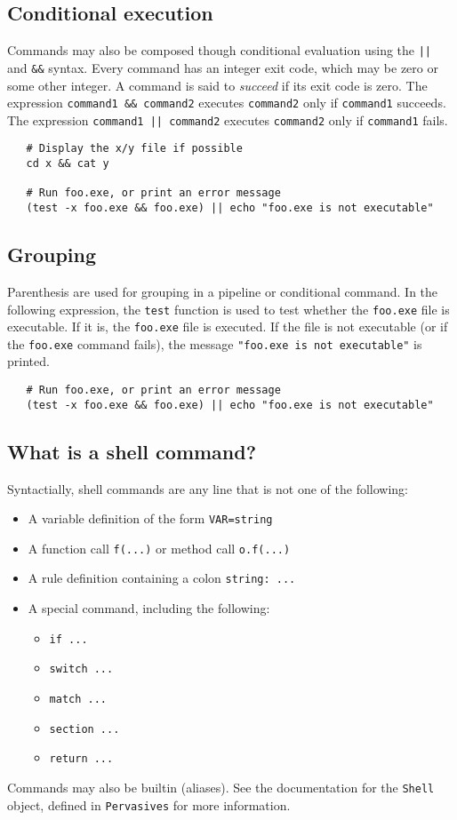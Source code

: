 \subsection{Conditional execution}

Commands may also be composed though conditional evaluation using the \verb+||+ and \verb+&&+
syntax.  Every command has an integer exit code, which may be zero or some other integer.  A command
is said to \emph{succeed} if its exit code is zero.  The expression \verb+command1 && command2+
executes \verb+command2+ only if \verb+command1+ succeeds.  The expression
\verb+command1 || command2+ executes \verb+command2+ only if \verb+command1+ fails.

\begin{verbatim}
   # Display the x/y file if possible
   cd x && cat y

   # Run foo.exe, or print an error message
   (test -x foo.exe && foo.exe) || echo "foo.exe is not executable"
\end{verbatim}

\subsection{Grouping}

Parenthesis are used for grouping in a pipeline or conditional command.  In the following
expression, the \verb+test+ function is used to test whether the \verb+foo.exe+ file is executable.
If it is, the \verb+foo.exe+ file is executed.  If the file is not executable (or if the
\verb+foo.exe+ command fails), the message \verb+"foo.exe is not executable"+ is printed.

\begin{verbatim}
   # Run foo.exe, or print an error message
   (test -x foo.exe && foo.exe) || echo "foo.exe is not executable"
\end{verbatim}

\subsection{What is a shell command?}

Syntactially, shell commands are any line that is not one of the following:

\begin{itemize}
\item A variable definition of the form \verb+VAR=string+
\item A function call \verb+f(...)+ or method call \verb+o.f(...)+
\item A rule definition containing a colon \verb+string: ...+
\item A special command, including the following:
\begin{itemize}
\item \verb+if ...+
\item \verb+switch ...+
\item \verb+match ...+
\item \verb+section ...+
\item \verb+return ...+
\end{itemize}
\end{itemize}

Commands may also be builtin (aliases).  See the documentation for the \verb+Shell+ object, defined
in \verb+Pervasives+ for more information.

